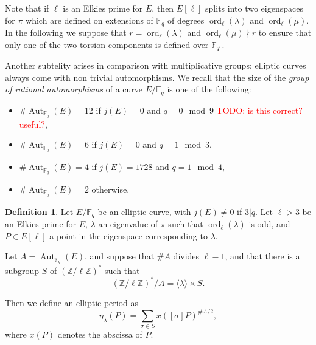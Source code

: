 \documentclass[12pt]{article}
\theoremstyle{plain}
\theoremstyle{definition}
\newtheorem{definition}[theorem]{Definition}
\newcommand{\todo}[1]{\textcolor{red}{TODO: #1}}
\DeclareMathOperator{\order}{ord} %
\DeclareMathOperator{\Aut}{Aut}
\def\Z{\ensuremath{\mathbb{Z}}}
\def\F{\ensuremath{\mathbb{F}}}
\begin{document}
Note that if $\ell$ is an Elkies prime for $E$,
then $E[\ell]$ splits into two eigenspaces for $\pi$
which are defined on extensions of $\F_q$ of degrees
$\order_\ell(\lambda)$ and $\order_\ell(\mu)$.
In the following we suppose that $r = \order_\ell(\lambda)$
and $\order_\ell(\mu) \nmid r$
to ensure that only one of the two torsion components
is defined over $\F_{q^r}$.

Another subtelity arises in comparison with multiplicative groups:
elliptic curves always come with non trivial automorphisms. We recall
that the size of the \emph{group of rational automorphisms} of a curve
$E/\F_q$ is one of the following:
\begin{itemize}
\item $\#\Aut_{\F_q}(E) = 12$ if $j(E)=0$ and $q=0\mod 9$ \todo{is this correct? useful?},
\item $\#\Aut_{\F_q}(E) = 6$ if $j(E)=0$ and $q=1\mod 3$,
\item $\#\Aut_{\F_q}(E) = 4$ if $j(E)=1728$ and $q=1\mod 4$,
\item $\#\Aut_{\F_q}(E) = 2$ otherwise.
\end{itemize}

\begin{definition}
\label{definition:ellperiod}
Let $E/\F_q$ be an elliptic curve, with $j(E)\ne0$ if $3|q$.
Let $\ell > 3$ be an Elkies prime for $E$,
$\lambda$ an eigenvalue of $\pi$ such that $\order_\ell(\lambda)$ is odd,
and $P \in E[\ell]$ a point in the eigenspace corresponding
to $\lambda$.

Let $A=\Aut_{\F_q}(E)$, and suppose that $\# A$ divides $\ell - 1$,
and that there is a subgroup $S$ of $(\Z/\ell\Z)^{\ast}$ such that
\begin{equation}
(\Z/\ell\Z)^{\ast} / A = \langle{\lambda}\rangle \times S.
\end{equation}

Then we define an elliptic period as
\begin{equation}
\eta_\lambda(P) = \sum_{\sigma\in S} {x \left([\sigma] P \right)^{\# A/2}},
\end{equation}
where $x(P)$ denotes the abscissa of $P$.
\end{definition}
\end{document}
